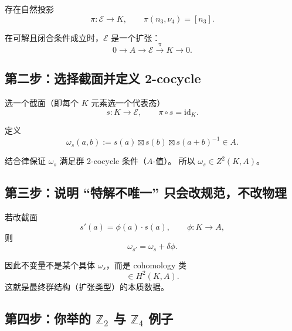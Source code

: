 \documentclass[a4paper,fontset=ubuntu,12pt]{ctexart}
\begin{document}
存在自然投影
\begin{equation}
\pi:\mathcal{E}\to K,\qquad \pi(n_3,\nu_4)=[n_3].
\label{eq:projection}
\end{equation}

在可解且闭合条件成立时，$\mathcal{E}$ 是一个扩张：
\begin{equation}
0\longrightarrow A\longrightarrow \mathcal{E}\overset{\pi}{\longrightarrow}K\longrightarrow 0.
\label{eq:short-exact}
\end{equation}

\subsection{第二步：选择截面并定义 2-cocycle}

选一个截面（即每个 $K$ 元素选一个代表态）
\begin{equation}
s:K\to \mathcal{E},\qquad \pi\circ s=\mathrm{id}_K.
\label{eq:section}
\end{equation}

定义
\begin{equation}
\omega_s(a,b):=s(a)\boxtimes s(b)\boxtimes s(a+b)^{-1}\in A.
\label{eq:omega-def}
\end{equation}

结合律保证 $\omega_s$ 满足群 2-cocycle 条件（$A$-值）。
所以 $\omega_s\in Z^2(K,A)$。

\subsection{第三步：说明 ``特解不唯一'' 只会改规范，不改物理}

若改截面
\begin{equation}
s'(a)=\phi(a)\cdot s(a),\qquad \phi:K\to A,
\label{eq:section-change}
\end{equation}
则
\begin{equation}
\omega_{s'}=\omega_s+\delta\phi.
\label{eq:omega-gauge}
\end{equation}

因此不变量不是某个具体 $\omega_s$，而是 cohomology 类
\begin{equation}
[\omega]\in H^2(K,A).
\label{eq:extension-class}
\end{equation}
这就是最终群结构（扩张类型）的本质数据。

\subsection{第四步：你举的 $\mathbb{Z}_2$ 与 $\mathbb{Z}_4$ 例子}
\end{document}
